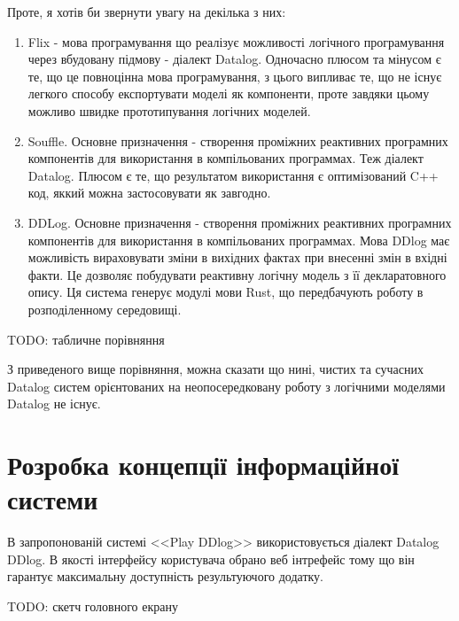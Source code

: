 Проте, я хотів би звернути увагу на декілька з них:

\begin{enumerate}

\item Flix -  мова програмування що реалізує можливості логічного програмування через вбудовану підмову - діалект Datalog. Одночасно плюсом та мінусом є те, що це повноцінна мова програмування, з цього випливає те, що не існує легкого способу експортувати моделі як компоненти, проте завдяки цьому можливо швидке прототипування логічних моделей.

\item Souffle. Основне призначення - створення проміжних реактивних програмних компонентів для використання в компільованих программах. Теж діалект Datalog. Плюсом є те, що результатом використання є оптимізований C++ код, яккий можна застосовувати як завгодно.

\item DDLog. Основне призначення - створення проміжних реактивних програмних компонентів для використання в компільованих программах. Мова DDlog має можливість вираховувати зміни в вихідних фактах при внесенні змін в вхідні факти. Це дозволяє побудувати реактивну логічну модель з її декларатовного опису. Ця система генерує модулі мови Rust, що передбачують роботу в розподіленному середовищі.

\end{enumerate}

TODO: табличне порівняння

З приведеного вище порівняння, можна сказати що нині, чистих та сучасних Datalog систем орієнтованих на неопосередковану роботу з логічними моделями Datalog не існує.

\section{Розробка концепції інформаційної системи}

В запропонованій системі <<Play DDlog>> використовується діалект Datalog DDlog.  В якості інтерфейсу користувача обрано веб інтрефейс тому що він гарантує максимальну доступність результуючого додатку.

TODO: скетч головного екрану